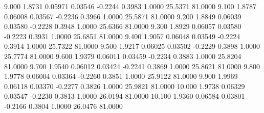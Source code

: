    9.000   1.8731   0.05971   0.03546  -0.2244   0.3983   1.0000  25.5371  81.0000
   9.100   1.8787   0.06008   0.03567  -0.2236   0.3966   1.0000  25.5871  81.0000
   9.200   1.8849   0.06039   0.03580  -0.2228   0.3948   1.0000  25.6366  81.0000
   9.300   1.8929   0.06057   0.03580  -0.2223   0.3931   1.0000  25.6851  81.0000
   9.400   1.9057   0.06048   0.03549  -0.2224   0.3914   1.0000  25.7322  81.0000
   9.500   1.9217   0.06025   0.03502  -0.2229   0.3898   1.0000  25.7774  81.0000
   9.600   1.9379   0.06011   0.03459  -0.2234   0.3883   1.0000  25.8204  81.0000
   9.700   1.9540   0.06012   0.03424  -0.2241   0.3869   1.0000  25.8621  81.0000
   9.800   1.9778   0.06004   0.03364  -0.2260   0.3851   1.0000  25.9122  81.0000
   9.900   1.9969   0.06118   0.03370  -0.2277   0.3826   1.0000  25.9821  81.0000
  10.000   1.9738   0.06329   0.03547  -0.2230   0.3813   1.0000  26.0194  81.0000
  10.100   1.9360   0.06584   0.03801  -0.2166   0.3804   1.0000  26.0476  81.0000
